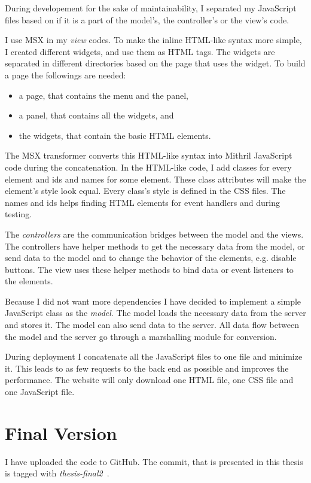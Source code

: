 During developement for the sake of maintainability, I separated my JavaScript files based on if it is a part of the model's, the controller's or the view's code. 

I use MSX in my \emph{view} codes. To make the inline HTML-like syntax more simple, I created different widgets, and use them as HTML tags. The widgets are separated in different directories based on the page that uses the widget. To build a page the followings are needed: 
\begin{itemize}
	\item a page, that contains the menu and the panel,
	\item a panel, that contains all the widgets, and
	\item the widgets, that contain the basic HTML elements.
\end{itemize}

The MSX transformer converts this HTML-like syntax into Mithril JavaScript code during the concatenation. In the HTML-like code, I add classes for every element and ids and names for some element. These class attributes will make the element's style look equal. Every class's style is defined in the CSS files. The names and ids helps finding HTML elements for event handlers and during testing.

The \emph{controllers} are the communication bridges between the model and the views. The controllers have helper methods to get the necessary data from the model, or send data to the model and to change the behavior of the elements, e.g. disable buttons. The view uses these helper methods to bind data or event listeners to the elements.

Because I did not want more dependencies I have decided to implement a simple JavaScript class as the \emph{model}. The model loads the necessary data from the server and stores it. The model can also send data to the server. All data flow between the model and the server go through a marshalling module for conversion.

During deployment I concatenate all the JavaScript files to one file and minimize it. This leads to as few requests to the back end as possible and improves the performance. The website will only download one HTML file, one CSS file and one JavaScript file.

\section{Final Version}
I have uploaded the code to GitHub. The commit, that is presented in this thesis is tagged with \emph{thesis-final2}~\cite{Github-final}.
